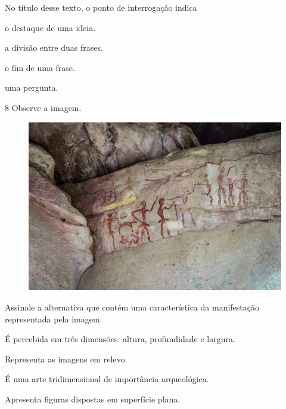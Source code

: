 No título desse texto, o ponto de interrogação indica

\begin{minipage}{.5\textwidth}
\begin{escolha}
\item o destaque de uma ideia.

\item a divisão entre duas frases.

\item o fim de uma frase.

\item uma pergunta.
\end{escolha}
\end{minipage}

\pagebreak
\num{8}  Observe a imagem.

\begin{figure}[htpb!]
\includegraphics[width=.9\textwidth]{./imgs/art44.png}
\end{figure}

Assinale a alternativa que contém uma característica da manifestação representada pela imagem.

\begin{escolha}
\item
  É percebida em três dimensões: altura, profundidade e largura.
\item
  Representa as imagens em relevo.
\item
  É uma arte tridimensional de importância arqueológica.
\item
  Apresenta figuras dispostas em superfície plana.
\end{escolha}

